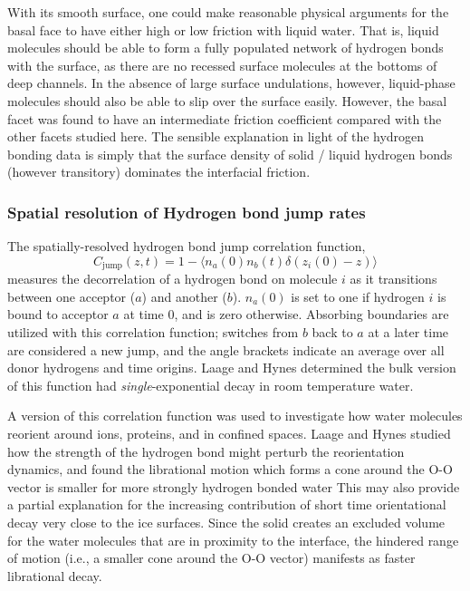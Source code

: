 With its smooth surface, one could make reasonable physical arguments
for the basal face to have either high or low friction with liquid
water. That is, liquid molecules should be able to form a fully
populated network of hydrogen bonds with the surface, as there are no
recessed surface molecules at the bottoms of deep channels. In the
absence of large surface undulations, however, liquid-phase molecules
should also be able to slip over the surface easily. However, the
basal facet was found to have an intermediate friction coefficient
compared with the other facets studied here. The sensible explanation
in light of the hydrogen bonding data is simply that the surface
density of solid / liquid hydrogen bonds (however transitory)
dominates the interfacial friction.

\subsubsection{Spatial resolution of Hydrogen bond jump rates}
The spatially-resolved hydrogen bond jump correlation function,
\begin{equation}\label{jump}
C_\mathrm{jump}(z,t) = 1 - \langle n_a(0) n_b(t) \delta(z_i(0) - z) \rangle
\end{equation}
measures the decorrelation of a hydrogen bond on molecule $i$ as it
transitions between one acceptor ($a$) and another ($b$). $n_a(0)$ is
set to one if hydrogen $i$ is bound to acceptor $a$ at time $0$, and
is zero otherwise.  Absorbing boundaries are utilized with this
correlation function; switches from $b$ back to $a$ at a later time
are considered a new jump, and the angle brackets indicate an average
over all donor hydrogens and time origins. Laage and Hynes determined
the bulk version of this function had \textit{single}-exponential
decay in room temperature water.

A version of this correlation function was used to investigate how
water molecules reorient around
ions\cite{Laage2007,Laage2008a,Stirnemann2011a,Laage2011},
proteins\cite{Duboue-Dijon2014}, and in confined
spaces\cite{Laage2012b,Fogarty2014}.  Laage and Hynes studied how the
strength of the hydrogen bond might perturb the reorientation
dynamics,\cite{Laage2006a} and found the librational motion which
forms a cone around the O-O vector is smaller for more strongly
hydrogen bonded water This may also provide a partial explanation for
the increasing contribution of short time orientational decay very
close to the ice surfaces.  Since the solid creates an excluded volume
for the water molecules that are in proximity to the interface, the
hindered range of motion (i.e., a smaller cone around the O-O vector)
manifests as faster librational decay.

